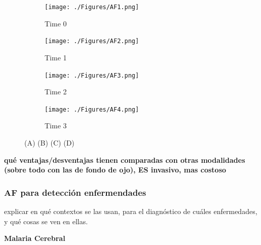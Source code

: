 \begin{figure}[H]
	\centering
	\begin{subfigure}[b]{0.23\textwidth}
        \texttt{[image: ./Figures/AF1.png]}
        \caption{Time 0}
        \label{fig:af1}
    \end{subfigure}
	\begin{subfigure}[b]{0.23\textwidth}
        \texttt{[image: ./Figures/AF2.png]}
        \caption{Time 1}
        \label{fig:af2}
    \end{subfigure}
	\begin{subfigure}[b]{0.23\textwidth}
        \texttt{[image: ./Figures/AF3.png]}
        \caption{Time 2}
        \label{fig:af3}
    \end{subfigure}
    	\begin{subfigure}[b]{0.23\textwidth}
        \texttt{[image: ./Figures/AF4.png]}
        \caption{Time 3}
        \label{fig:af4}
    \end{subfigure}
	\label{fig:retina}
	\caption{(A) (B) (C) (D)}
\end{figure}

\textbf{qué ventajas/desventajas tienen comparadas con otras modalidades (sobre todo con las de fondo de ojo),
ES invasivo, mas costoso}

\subsubsection{AF para detección enfermendades }

explicar en qué contextos se las usan, para el diagnóstico de cuáles enfermedades, y qué cosas se ven en ellas.

\textbf{Malaria Cerebral}

